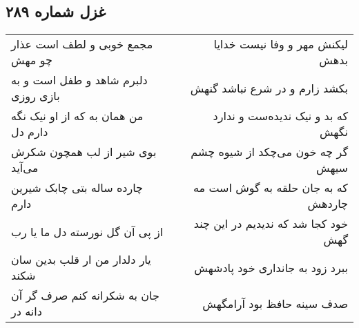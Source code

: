 \begin{center}
\section*{غزل شماره ۲۸۹}
\label{sec:sh289}
\begin{longtable}{l p{0.5cm} r}
مجمع خوبی و لطف است عذار چو مهش
&&
لیکنش مهر و وفا نیست خدایا بدهش
\\
دلبرم شاهد و طفل است و به بازی روزی
&&
بکشد زارم و در شرع نباشد گنهش
\\
من همان به که از او نیک نگه دارم دل
&&
که بد و نیک ندیده‌ست و ندارد نگهش
\\
بوی شیر از لب همچون شکرش می‌آید
&&
گر چه خون می‌چکد از شیوه چشم سیهش
\\
چارده ساله بتی چابک شیرین دارم
&&
که به جان حلقه به گوش است مه چاردهش
\\
از پی آن گل نورسته دل ما یا رب
&&
خود کجا شد که ندیدیم در این چند گهش
\\
یار دلدار من ار قلب بدین سان شکند
&&
ببرد زود به جانداری خود پادشهش
\\
جان به شکرانه کنم صرف گر آن دانه در
&&
صدف سینه حافظ بود آرامگهش
\\
\end{longtable}
\end{center}
